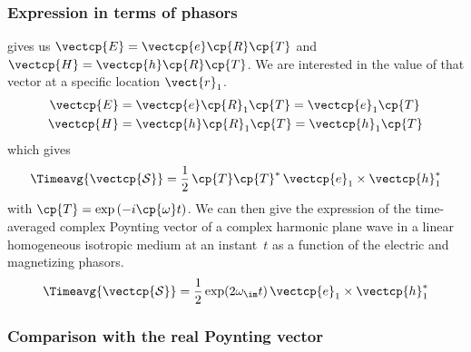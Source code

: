 
\subsubsection{Expression in terms of phasors}

 gives us $\vectcp{E} = \vectcp{e} \cp{R} \cp{T}$
and $\vectcp{H} = \vectcp{h} \cp{R} \cp{T}$.
We are interested in the value of that vector at a specific location $\vect{r}_1$.
\begin{align}
    \vectcp{E} &= \vectcp{e} \cp{R}_1 \cp{T} = \vectcp{e}_1 \cp{T} \\
    \vectcp{H} &= \vectcp{h} \cp{R}_1 \cp{T} = \vectcp{h}_1 \cp{T}
\end{align}
which gives
\begin{equation}
    \Timeavg{\vectcp{\mathcal{S}}} =
    \frac{1}{2}
    \,
    \cp{T}\cp{T}^*
    \,
    \vectcp{e}_1 \times \vectcp{h}_1^*
\end{equation}
with $\cp{T} = \exp\left(-i \cp{\omega} t \right)$.
We can then give the expression of the time-averaged complex Poynting vector of a complex harmonic plane wave in a linear homogeneous isotropic medium at an instant~$t$ as a function of the electric and magnetizing phasors.
\begin{equation}
    \Timeavg{\vectcp{\mathcal{S}}}
    =
    \frac{1}{2}
    \exp(2\omega_\im t)
    \,
    \vectcp{e}_1 \times \vectcp{h}_1^*
    \label{eq:time_avg_cplx_poynting_phasors}
\end{equation}



\subsubsection{Comparison with the real Poynting vector}

